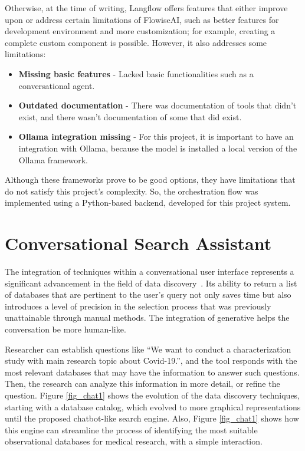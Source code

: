 Otherwise, at the time of writing, Langflow offers features that either improve upon or address certain limitations of FlowiseAI, such as better features for development environment and more customization; for example, creating a complete custom component is possible. However, it also addresses some limitations:

\begin{itemize}
	\item \textbf{Missing basic features} - Lacked basic functionalities such as a conversational agent.
	\item \textbf{Outdated documentation} - There was documentation of tools that didn't exist, and there wasn't documentation of some that did exist. 
	\item \textbf{Ollama integration missing} - For this project, it is important to have an integration with Ollama, because the {\llm} model is installed a local version of the Ollama framework.
\end{itemize}


Although these frameworks prove to be good options, they have limitations that do not satisfy this project's complexity. So, the {\llm} orchestration flow was implemented using a Python-based backend, developed for this project system.


\section{Conversational Search Assistant}

The integration of {\ir} techniques within a conversational user interface represents a significant advancement in the field of data discovery~\cite{ritzel2019development}. Its ability to return a list of databases that are pertinent to the user's query not only saves time but also introduces a level of precision in the selection process that was previously unattainable through manual methods. The integration of generative {\ai} helps the conversation be more human-like. %

Researcher can establish questions like ``We want to conduct a characterization study with main research topic about Covid-19.'', and the tool responds with the most relevant databases that may have the information to answer such questions. Then, the research can analyze this information in more detail, or refine the question. Figure \ref{fig_chat1} shows the evolution of the data discovery techniques, starting with a database catalog, which evolved to more graphical representations until the proposed chatbot-like search engine. Also, Figure \ref{fig_chat1} shows how this engine can streamline the process of identifying the most suitable observational databases for medical research, with a simple interaction.

